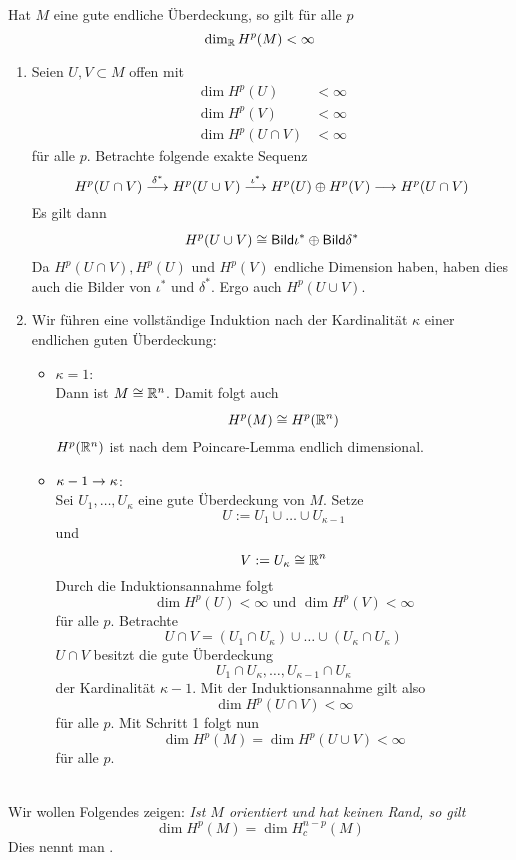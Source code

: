\Satz{}
Hat $M$ eine gute endliche Überdeckung, so gilt für alle $p$
\[ \dim_{\mathbb{R}} H^p(M) < \infty \]
\begin{Beweis}{}
\begin{enumerate}
	\item Seien $U,V \subset M$ offen mit
	\begin{align*}
	\dim H^p(U) &< \infty\\
	\dim H^p(V) &< \infty\\
	\dim H^p(U\cap V) &< \infty
	\end{align*}
	für alle $p$. Betrachte folgende exakte Sequenz
	\[ 
	H^p(U\cap V)
	\overset{\delta^*}{\longrightarrow}
	H^p(U\cup V)
	\overset{\iota^*}{\longrightarrow}
	H^p(U) \oplus H^p(V)
	\overset{}{\longrightarrow}
	H^p(U\cap V)
	 \]
	 Es gilt dann
	 \[ H^p(U\cup V) \overset{}{\cong} \textsf{Bild} \iota^* \oplus \textsf{Bild} \delta^* \]
	 Da $H^p(U\cap V), H^p(U)$ und $H^p(V)$ endliche Dimension haben, haben dies auch die Bilder von $\iota^*$ und $\delta^*$. Ergo auch $H^p(U\cup V)$.
	 \item Wir führen eine vollständige Induktion nach der Kardinalität $\kappa$ einer endlichen guten Überdeckung:
	 \begin{itemize}
	 	\item $\kappa = 1$:\\
	 	Dann ist $M \overset{}{\cong} \mathbb{R}^n$. Damit folgt auch
	 	\[ H^p(M) \overset{}{\cong} H^p(\mathbb{R}^n) \]
	 	$H^p(\mathbb{R}^n)$ ist nach dem Poincare-Lemma endlich dimensional.
	 	\item $\kappa - 1 \overset{}{\rightarrow} \kappa$:\\
	 	Sei $U_1, \ldots, U_\kappa$ eine gute Überdeckung von $M$. Setze
	 	\[ U:= U_1 \cup \ldots \cup U_{\kappa-1} \]
	 	und
	 	\[ V:= U_\kappa \overset{}{\cong} \mathbb{R}^n \]
	 	Durch die Induktionsannahme folgt
	 	\[ \dim H^p(U)< \infty \text{  und  } \dim H^p(V)<\infty \]
	 	für alle $p$. Betrachte
	 	\[ U\cap V = (U_1\cap U_\kappa) \cup \ldots \cup (U_\kappa\cap U_\kappa) \]
	 	$U\cap V$ besitzt die gute Überdeckung
	 	\[ U_1\cap U_\kappa, \ldots, U_{\kappa - 1} \cap U_\kappa \]
	 	der Kardinalität $\kappa - 1$. Mit der Induktionsannahme gilt also
	 	\[ \dim H^p(U\cap V) < \infty \]
	 	für alle $p$. Mit Schritt 1 folgt nun
	 	\[ \dim H^p(M) = \dim H^p(U\cup V) < \infty \]
	 	für alle $p$.
	 \end{itemize}
\end{enumerate}
\end{Beweis}\\
Wir wollen Folgendes zeigen: \textit{Ist $M$ orientiert und hat keinen Rand, so gilt}
\[ \dim H^p(M) = \dim H_c^{n-p}(M) \]
Dies nennt man .\\

